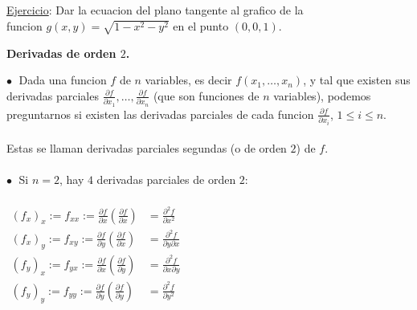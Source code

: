 \documentclass{article}
\theoremstyle{definition}
\theoremstyle{remark}
\newcommand\bl{$\bullet\;$}
\begin{document}
  \begin{figure}[h]
\centering
\def\svgwidth{0.65\textwidth}
\makebox[\textwidth]{
}
\end{figure} \;  
\\\\\\\\\\\\\\\\\\
\underline{Ejercicio}:
  Dar la ecuacion del plano tangente al grafico de la\\ funcion $g(x,y)=\sqrt{1-x^2-y^2}$ en el punto $(0,0,1).$
  \begin{figure}[h]
\centering
\def\svgwidth{0.65\textwidth}
\makebox[\textwidth]{
}
\end{figure} 
\begin{center}
\textbf{Derivadas de orden $2$.}
\end{center}
\textcolor{rojop2}{\bl} Dada una funcion $f$ de $n$ variables, es decir $f(x_1,\dots,x_n)$, y tal que existen sus derivadas parciales $\frac{\partial f}{\partial x_1},\dots,\frac{\partial f}{\partial x_n}$ (que son funciones de $n$ variables), podemos preguntarnos si existen las derivadas parciales de cada funcion $\frac{\partial f}{\partial x_i}$, $1 \leq i \leq n$. \\\\ Estas se llaman derivadas parciales segundas (o de orden $2$) de $f$. \\\\
\textcolor{verdep2}{\bl} Si $n=2$, hay $4$ derivadas parciales de orden $2$: \\\\ $\begin{aligned} 
  (f_x)_x := f_{xx} := \frac{\partial f}{\partial x} \left(\frac{\partial f}{\partial x}\right) & = \frac{\partial^2 f}{\partial x^2} \\
  (f_x)_y := f_{xy} := \frac{\partial f}{\partial y} \left(\frac{\partial f}{\partial x}\right) & = \frac{\partial^2 f}{\partial y \partial x} \\
  (f_y)_x := f_{yx} := \frac{\partial f}{\partial x}\left(\frac{\partial f}{\partial y }\right) & =\frac{\partial^2 f}{\partial x \partial y} \\
  (f_y)_y := f_{yy} := \frac{\partial f}{\partial y}\left(\frac{\partial f}{\partial y }\right) & =\frac{\partial^2 f}{\partial y^2} \\
\end{aligned}$ \\\\
\end{document}
